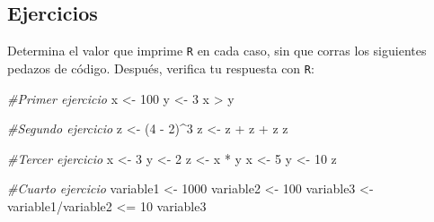 \documentclass[
]{book}
\newenvironment{Shaded}{\begin{snugshade}}{\end{snugshade}}
\newcommand{\CommentTok}[1]{\textcolor[rgb]{0.56,0.35,0.01}{\textit{#1}}}
\newcommand{\DecValTok}[1]{\textcolor[rgb]{0.00,0.00,0.81}{#1}}
\newcommand{\NormalTok}[1]{#1}
\newcommand{\OtherTok}[1]{\textcolor[rgb]{0.56,0.35,0.01}{#1}}
\newcommand{\SpecialCharTok}[1]{\textcolor[rgb]{0.00,0.00,0.00}{#1}}
\begin{document}
\hypertarget{ejercicios-2}{%
\subsection{Ejercicios}\label{ejercicios-2}}

Determina el valor que imprime \texttt{R} en cada caso, sin que corras los siguientes pedazos de código. Después, verifica tu respuesta con \texttt{R}:

\begin{Shaded}
\begin{Highlighting}[]
\CommentTok{\#Primer ejercicio}
\NormalTok{x }\OtherTok{\textless{}{-}} \DecValTok{100}
\NormalTok{y }\OtherTok{\textless{}{-}} \DecValTok{3}
\NormalTok{x }\SpecialCharTok{\textgreater{}}\NormalTok{ y}
\end{Highlighting}
\end{Shaded}

\begin{Shaded}
\begin{Highlighting}[]
\CommentTok{\#Segundo ejercicio}
\NormalTok{z }\OtherTok{\textless{}{-}}\NormalTok{ (}\DecValTok{4} \SpecialCharTok{{-}} \DecValTok{2}\NormalTok{)}\SpecialCharTok{\^{}}\DecValTok{3}
\NormalTok{z }\OtherTok{\textless{}{-}}\NormalTok{ z }\SpecialCharTok{+}\NormalTok{ z }\SpecialCharTok{+}\NormalTok{ z}
\NormalTok{z}
\end{Highlighting}
\end{Shaded}

\begin{Shaded}
\begin{Highlighting}[]
\CommentTok{\#Tercer ejercicio}
\NormalTok{x }\OtherTok{\textless{}{-}} \DecValTok{3}
\NormalTok{y }\OtherTok{\textless{}{-}} \DecValTok{2}
\NormalTok{z }\OtherTok{\textless{}{-}}\NormalTok{ x }\SpecialCharTok{*}\NormalTok{ y}
\NormalTok{x }\OtherTok{\textless{}{-}} \DecValTok{5}
\NormalTok{y }\OtherTok{\textless{}{-}} \DecValTok{10}
\NormalTok{z}
\end{Highlighting}
\end{Shaded}

\begin{Shaded}
\begin{Highlighting}[]
\CommentTok{\#Cuarto ejercicio}
\NormalTok{variable1 }\OtherTok{\textless{}{-}} \DecValTok{1000}
\NormalTok{variable2 }\OtherTok{\textless{}{-}} \DecValTok{100}
\NormalTok{variable3 }\OtherTok{\textless{}{-}}\NormalTok{ variable1}\SpecialCharTok{/}\NormalTok{variable2 }\SpecialCharTok{\textless{}=} \DecValTok{10}
\NormalTok{variable3}
\end{Highlighting}
\end{Shaded}
\end{document}
